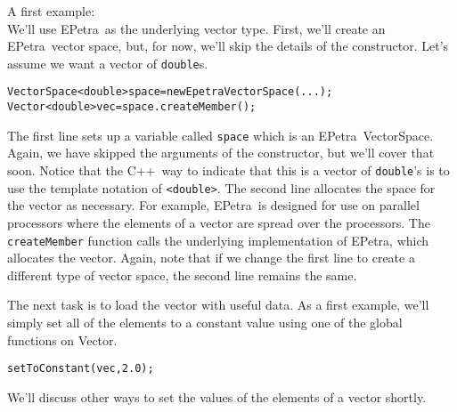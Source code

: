 \documentclass[12pt]{article}
\newcommand{\epetra}{{\sf EPetra}}
\newcommand{\cpp}{{\sf C++}}
\renewcommand{\vector}{{\sf Vector}}
\newcommand{\vectorSpace}{{\sf VectorSpace}}
\newcommand{\double}{{\tt double}}
\newcommand{\lcode}[1]{{\tt #1}}
\newenvironment{dcode}{  \begin{center} 
    \begin{minipage}{.9\textwidth}
     \begin{alltt}}
{\end{alltt}
    \end{minipage}
  \end{center}}
\newcommand{\bdcode}{\begin{dcode}}
\newcommand{\edcode}{\end{dcode}}
\begin{document}
A first example: \\
We'll use \epetra\ as the underlying vector type.  First, we'll
create an \epetra\ vector space, but, for now, we'll skip the details
of the constructor.  Let's assume we want a vector of \double s.
\bdcode
VectorSpace<double> space = new EpetraVectorSpace(...); 
Vector<double> vec = space.createMember(); 
\edcode
The first line sets up a variable called \lcode{space} which is an
\epetra\ \vectorSpace.  Again, we have skipped the arguments of the
constructor, but we'll cover that soon.  Notice that the \cpp\ way to
indicate that this is a vector of \double 's is to use the template
notation of \lcode{<double>}.  The second line allocates the space for
the vector as necessary.  For example, \epetra\ is designed for use on
parallel processors where the elements of a vector are spread over the
processors.  The \lcode{createMember} function calls the underlying
implementation of \epetra, which allocates the vector.  Again, note that
if we change the first line to create a different type of vector
space, the second line remains the same.


The next task is to load the vector with useful data. As a first
example, we'll simply set all of the elements to a constant value
using one of the global functions on \vector.  
\bdcode
setToConstant(vec, 2.0);
\edcode
We'll discuss other ways to set the values of the elements of a vector
shortly.

\end{document}
